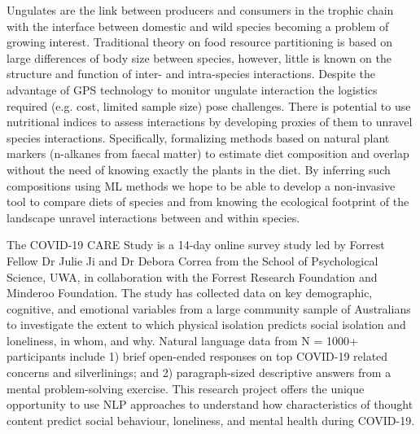 \documentclass[10pt,a4paper]{Projects}
\begin{document}
Ungulates are the link between producers and consumers in the trophic chain with the interface between domestic and wild species becoming a problem of growing interest.  Traditional theory on food resource partitioning is based on large  differences of body size between species, however, little is known on the structure and function of inter- and intra-species interactions.  Despite the advantage of GPS technology to monitor ungulate interaction the logistics required (e.g. cost, limited sample size) pose challenges.  There is potential to use nutritional indices to assess interactions by developing proxies of them to unravel species interactions.  Specifically, formalizing methods based on natural plant markers (n-alkanes from faecal matter) to estimate diet composition and overlap without the need of knowing exactly the plants in the diet.  By inferring such compositions using ML methods we hope to be able to develop a non-invasive tool to compare diets of species and from knowing the ecological footprint of the landscape unravel interactions between and within species.

The COVID-19 CARE Study is a 14-day online survey study led by Forrest Fellow Dr Julie Ji and Dr Debora Correa from the School of Psychological Science, UWA, in collaboration with the Forrest Research Foundation and Minderoo Foundation. The study has collected data on key demographic, cognitive, and emotional variables from a large community sample of Australians to investigate the extent to which physical isolation predicts social isolation and loneliness, in whom, and why. Natural language data from N = 1000+ participants include 1) brief open-ended responses on top COVID-19 related concerns and silverlinings; and 2) paragraph-sized descriptive answers from a mental problem-solving exercise. This research project offers the unique opportunity to use NLP approaches to  understand how characteristics of thought content predict social behaviour, loneliness, and mental health during COVID-19.
\end{document}
